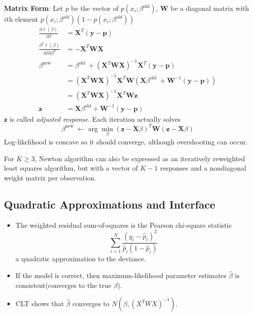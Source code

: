 \textbf{Matrix Form}: Let $p$ be the vector of $p(x_i;\beta^{\text{old}})$, 
$\mathbf{W}$ be a diagonal matrix with $i$th element $p(x_i;\beta^{old})
(1-p(x_i;\beta^{old}))$
\begin{align*} \frac{\partial \ell(\beta)}{\partial \beta} 
    &=\mathbf{X}^{T}(\mathbf{y}-\mathbf{p}) \\ 
\frac{\partial^{2} \ell(\beta)}{\partial \beta \partial \beta^{T}} 
&=-\mathbf{X}^{T} \mathbf{W} \mathbf{X} \\
\beta^{\text {new }} &=\beta^{\text {old }}+\left(\mathbf{X}^{T} 
\mathbf{W} \mathbf{X}\right)^{-1} \mathbf{X}^{T}(\mathbf{y}-\mathbf{p}) \\ 
&=\left(\mathbf{X}^{T} \mathbf{W} \mathbf{X}\right)^{-1} \mathbf{X}^{T} 
\mathbf{W}\left(\mathbf{X} \beta^{\text {old }}+\mathbf{W}^{-1}(\mathbf{y}-
\mathbf{p})\right) \\ &=\left(\mathbf{X}^{T} \mathbf{W} \mathbf{X}\right)^{-1} 
\mathbf{X}^{T} \mathbf{W} \mathbf{z} \\
\mathbf{z}&=\mathbf{X} \beta^{\mathrm{old}}+\mathbf{W}^{-1}(\mathbf{y}-\mathbf{p})
\end{align*}
$\mathbf{z}$ is called \textit{adjusted response}. Each iteration actually solves
\begin{equation*}
\beta^{\text {new }} \leftarrow 
\arg \min _{\beta}(\mathbf{z}-\mathbf{X} \beta)^{T}
 \mathbf{W}(\mathbf{z}-\mathbf{X} \beta)
\end{equation*}
Log-likelihood is concave so it should converge, although overshooting can occur. 

For $K\ge 3$, Newton algorithm can also be expressed as an iteratively reweighted 
least squares algorithm, but with a vector of $K-1$ responses and a nondiagonal 
weight matrix per observation. 

\subsection{Quadratic Approximations and Interface}
\begin{itemize}
\item The weighted residual sum-of-squares is the Pearson chi-square statistic
\begin{equation*}
    \sum_{i=1}^{N} 
    \frac{\left(y_{i}-\hat{p}_{i}\right)^{2}}{\hat{p}_{i}\left(1-\hat{p}_{i}\right)}
\end{equation*}
a quadratic approximation to the deviance.
\item If the model is correct, then maximum-likelihood parameter estimates
$\hat{\beta}$ is consistent(converges to the true $\beta$). 
\item CLT shows that $\hat{\beta}$ converges to $N(\beta,(X^TWX)^{-1})$. 
\end{itemize}

